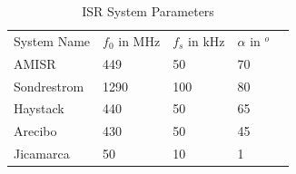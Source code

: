 \begin{table}[!h]
\centering
\caption{ISR System Parameters}
\label{tab:ISRsys}
\begin{tabular}{lllll}
System Name & $f_0$ in MHz & $f_s$ in kHz & $\alpha$ in $^o$ &  \\
AMISR       & 449          & 50           & 70               &  \\
Sondrestrom & 1290         & 100          & 80               &  \\
Haystack    & 440          & 50           & 65               &  \\
Arecibo     & 430          & 50           & 45               &  \\
Jicamarca   & 50           & 10           & 1                & 
\end{tabular}
\end{table}